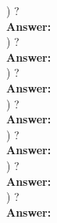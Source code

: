 \documentclass{article}
\begin{document}
\vspace{.3in}
) ?\\
\vspace{.1in}
{\bf Answer:} \\

\vspace{.3in}
) ?\\
\vspace{.1in}
{\bf Answer:} \\

\vspace{.3in}
) ?\\
\vspace{.1in}
{\bf Answer:} \\

\vspace{.3in}
) ?\\
\vspace{.1in}
{\bf Answer:} \\

\vspace{.3in}
) ?\\
\vspace{.1in}
{\bf Answer:} \\

\vspace{.3in}
) ?\\
\vspace{.1in}
{\bf Answer:} \\

\vspace{.3in}
) ?\\
\vspace{.1in}
{\bf Answer:} \\
\end{document}

